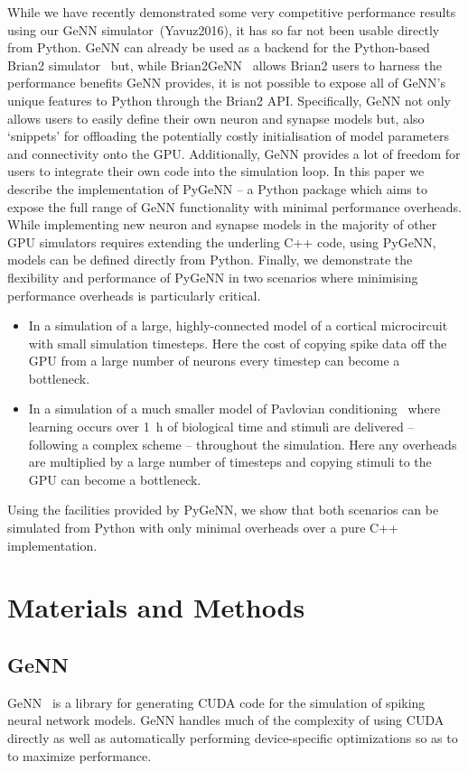 \documentclass[utf8]{frontiersSCNS} %
\begin{document}
While we have recently demonstrated some very competitive performance results~\citep{Knight2018,Knight2020} using our GeNN simulator~(Yavuz2016), it has so far not been usable directly from Python.
GeNN can already be used as a backend for the Python-based Brian2 simulator~\citep{Stimberg2019} but, while Brian2GeNN~\citep{Stimberg2020} allows Brian2 users to harness the performance benefits GeNN provides, it is not possible to expose all of GeNN's unique features to Python through the Brian2 API.
Specifically, GeNN not only allows users to easily define their own neuron and synapse models but, also `snippets' for offloading the potentially costly initialisation of model parameters and connectivity onto the GPU.
Additionally, GeNN  provides a lot of freedom for users to integrate their own code into the simulation loop.
In this paper we describe the implementation of PyGeNN -- a Python package which aims to expose the full range of GeNN functionality with minimal performance overheads.
While implementing new neuron and synapse models in the majority of other GPU simulators requires extending the underling C++ code, using PyGeNN, models can be defined directly from Python.
Finally, we demonstrate the flexibility and performance of PyGeNN in two scenarios where minimising performance overheads is particularly critical.
\begin{itemize}
    \item In a simulation of a large, highly-connected model of a cortical microcircuit~\citep{Potjans2012} with small simulation timesteps. Here the cost of copying spike data off the GPU from a large number of neurons every timestep can become a bottleneck.
    \item In a simulation of a much smaller model of Pavlovian conditioning~\citep{Izhikevich2007} where learning occurs over \SI{1}{\hour} of biological time and stimuli are delivered -- following a complex scheme -- throughout the simulation. Here any overheads are multiplied by a large number of timesteps and copying stimuli to the GPU can become a bottleneck.
\end{itemize}
Using the facilities provided by PyGeNN, we show that both scenarios can be simulated from Python with only minimal overheads over a pure C++ implementation.

\section{Materials and Methods}
\subsection{GeNN}
\label{sec:methods/genn}
GeNN~\citep{Yavuz2016} is a library for generating CUDA code for the simulation of spiking neural network models.
GeNN handles much of the complexity of using CUDA directly as well as automatically performing device-specific optimizations so as to to maximize performance.
\end{document}
